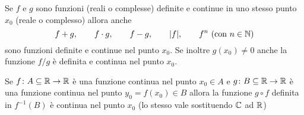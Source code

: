   \begin{theorem}
  \label{th:continuita_composizione}%
  Se $f$ e $g$ sono funzioni (reali o complesse) definite e continue
  in uno stesso punto $x_0$ (reale o complesso)
  allora anche
  \[
    f+g, \qquad
    f\cdot g, \qquad
    f-g, \qquad
    {\left|f\right|}, \qquad
    f^n\ \text{(con $n\in {\mathbb N}$)}
  \]
  sono funzioni definite e continue nel punto $x_0$.
  Se inoltre $g(x_0)\neq 0$ anche la funzione
  $f/g$
  è definita e continua nel punto $x_0$.
  
  Se $f\colon A\subseteq {\mathbb R} \to {\mathbb R}$ è una funzione continua
  nel punto $x_0\in A$ e
  $g\colon B\subseteq {\mathbb R} \to {\mathbb R}$ è una funzione
  continua nel punto $y_0=f(x_0)\in B$ allora la funzione $g\circ f$
  definita in $f^{-1}(B)$ è continua nel punto $x_0$
  (lo stesso vale sostituendo ${\mathbb C}$ ad ${\mathbb R}$)
  \end{theorem}
